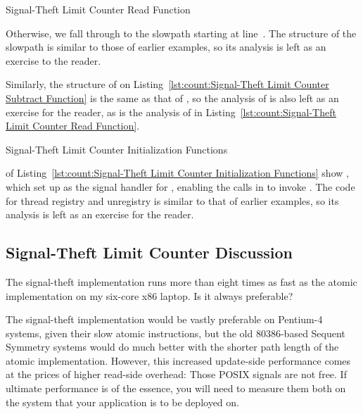 \begin{listing}[tbp]

\caption{Signal-Theft Limit Counter Read Function}
\label{lst:count:Signal-Theft Limit Counter Read Function}
\end{listing}

\begin{fcvref}
Otherwise, we fall through to the slowpath starting at line~.
The structure of the slowpath is similar to those of earlier examples,
so its analysis is left as an exercise to the reader.
\end{fcvref}
Similarly, the structure of  on
Listing~\ref{lst:count:Signal-Theft Limit Counter Subtract Function}
is the same
as that of , so the analysis of  is also
left as an exercise for the reader, as is the analysis of
 in
Listing~\ref{lst:count:Signal-Theft Limit Counter Read Function}.

\begin{listing}[tbp]

\caption{Signal-Theft Limit Counter Initialization Functions}
\label{lst:count:Signal-Theft Limit Counter Initialization Functions}
\end{listing}

\begin{fcvref}
 of
Listing~\ref{lst:count:Signal-Theft Limit Counter Initialization Functions}
show , which set up 
as the signal handler for ,
enabling the  calls in 
to invoke .
The code for thread registry and unregistry is similar to that of
earlier examples, so its analysis is left as an exercise for the
reader.
\end{fcvref}

\subsection{Signal-Theft Limit Counter Discussion}

The signal-theft implementation runs more than eight times as fast as the
atomic implementation on my six-core x86 laptop.
Is it always preferable?

The signal-theft implementation would be vastly preferable on Pentium-4
systems, given their slow atomic instructions, but the old 80386-based
Sequent Symmetry systems would do much better with the shorter path
length of the atomic implementation.
However, this increased update-side performance comes at the
prices of higher read-side overhead: Those POSIX signals are not free.
If ultimate performance is of the essence, you will need to measure
them both on the system that your application is to be deployed on.

